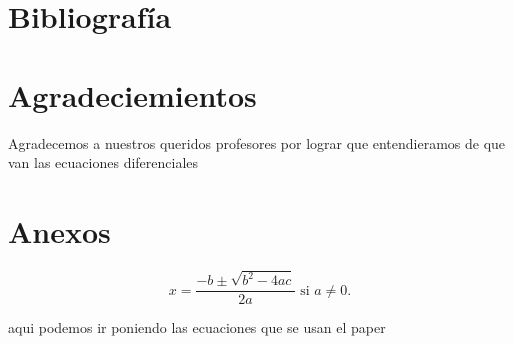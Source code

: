 \documentclass{wscpaperproc}
\theoremstyle{wsc}
\begin{document}



\section*{Bibliograf\'ia}


\section*{Agradeciemientos}
Agradecemos a nuestros queridos profesores por lograr que entendieramos de que van las ecuaciones diferenciales

\appendix

\section{Anexos} \label{app:quadratic}

\begin{equation} \label{eq:quadraticsol}
x = \frac{-b \pm \sqrt{b^2-4ac}}{2a} \mbox{ si } a \ne 0.
\end{equation}

aqui podemos ir poniendo las ecuaciones que se usan el paper
\end{document}
